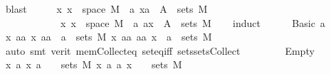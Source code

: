 \begin{isabellebody}
\ blast\isanewline
\ \ \isamarkupfalse%
\ \isamarkupfalse%
\ {\isachardoublequoteopen}{\isasymAnd}x{\isachardot}{\kern0pt}\ x\ {\isasymin}\ space\ M{}\ {\isasymLongrightarrow}\ {\isacharbraceleft}{\kern0pt}a{\isachardot}{\kern0pt}\ {\isacharparenleft}{\kern0pt}x{\isacharcomma}{\kern0pt}a{\isacharparenright}{\kern0pt}\ {\isasymin}\ A{\isacharbraceright}{\kern0pt}\ {\isasymin}\ sets\ M{}{\isachardoublequoteclose}\isanewline
\ \ \ \ \ \ \ \ \ \ \ \ {\isachardoublequoteopen}{\isasymAnd}x{\isachardot}{\kern0pt}\ x\ {\isasymin}\ space\ M{}\ {\isasymLongrightarrow}\ {\isacharbraceleft}{\kern0pt}a{\isachardot}{\kern0pt}\ {\isacharparenleft}{\kern0pt}a{\isacharcomma}{\kern0pt}x{\isacharparenright}{\kern0pt}\ {\isasymin}\ A{\isacharbraceright}{\kern0pt}\ {\isasymin}\ sets\ M{}{\isachardoublequoteclose}\isanewline
\ \ \isamarkupfalse%
\ induct\isanewline
\ \ \ \ \isamarkupfalse%
\ {\isacharparenleft}{\kern0pt}Basic\ a{\isacharparenright}{\kern0pt}\isanewline
\ \ \ \ \isamarkupfalse%
\ \isamarkupfalse%
\ {\isachardoublequoteopen}{\isasymAnd}x{\isachardot}{\kern0pt}\ {\isacharbraceleft}{\kern0pt}aa{\isachardot}{\kern0pt}\ {\isacharparenleft}{\kern0pt}x{\isacharcomma}{\kern0pt}\ aa{\isacharparenright}{\kern0pt}\ {\isasymin}\ a{\isacharbraceright}{\kern0pt}\ {\isasymin}\ sets\ M{}{\isachardoublequoteclose}\ {\isachardoublequoteopen}{\isasymAnd}x{\isachardot}{\kern0pt}\ {\isacharbraceleft}{\kern0pt}aa{\isachardot}{\kern0pt}\ {\isacharparenleft}{\kern0pt}aa{\isacharcomma}{\kern0pt}\ x{\isacharparenright}{\kern0pt}\ {\isasymin}\ a{\isacharbraceright}{\kern0pt}\ {\isasymin}\ sets\ M{}{\isachardoublequoteclose}\isanewline
\ \ \ \ \ \ \isamarkupfalse%
\ {\isacharparenleft}{\kern0pt}auto{\isacharcomma}{\kern0pt}\ smt\ {\isacharparenleft}{\kern0pt}verit{\isacharparenright}{\kern0pt}\ mem{\isacharunderscore}{\kern0pt}Collect{\isacharunderscore}{\kern0pt}eq\ set{\isacharunderscore}{\kern0pt}eq{\isacharunderscore}{\kern0pt}iff\ sets{\isachardot}{\kern0pt}sets{\isacharunderscore}{\kern0pt}Collect{\isacharparenleft}{\kern0pt}{}{\isacharparenright}{\kern0pt}{\isacharparenright}{\kern0pt}\isanewline
\ \ \isamarkupfalse%
\isanewline
\ \ \ \ \isamarkupfalse%
\ Empty\isanewline
\ \ \ \ \isamarkupfalse%
\ \isamarkupfalse%
\ {\isachardoublequoteopen}{\isasymAnd}x{\isachardot}{\kern0pt}\ {\isacharbraceleft}{\kern0pt}a{\isachardot}{\kern0pt}\ {\isacharparenleft}{\kern0pt}x{\isacharcomma}{\kern0pt}\ a{\isacharparenright}{\kern0pt}\ {\isasymin}\ {\isacharbraceleft}{\kern0pt}{\isacharbraceright}{\kern0pt}{\isacharbraceright}{\kern0pt}\ {\isasymin}\ sets\ M{}{\isachardoublequoteclose}\ {\isachardoublequoteopen}{\isasymAnd}x{\isachardot}{\kern0pt}\ {\isacharbraceleft}{\kern0pt}a{\isachardot}{\kern0pt}\ {\isacharparenleft}{\kern0pt}a{\isacharcomma}{\kern0pt}\ x{\isacharparenright}{\kern0pt}\ {\isasymin}\ {\isacharbraceleft}{\kern0pt}{\isacharbraceright}{\kern0pt}{\isacharbraceright}{\kern0pt}\ {\isasymin}\ sets\ M{}{\isachardoublequoteclose}\ \isamarkupfalse%

\end{isabellebody}
